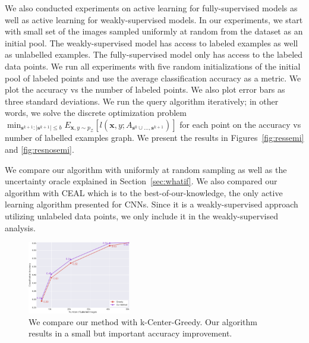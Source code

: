 \documentclass{article} %
\begin{document}
We also conducted experiments on active learning for fully-supervised models as well as active learning for weakly-supervised models. In our experiments, we start with small set of the images sampled uniformly at random from the dataset as an initial pool. The weakly-supervised model has access to labeled examples as well as unlabelled examples. The fully-supervised model only has access to the labeled data points. We run all experiments with five random initializations of the initial pool of labeled points and use the average classification accuracy as a metric. We plot the accuracy vs the number of labeled points. We also plot error bars as three standard deviations. We run the query algorithm iteratively; in other words, we solve the discrete optimization problem $\min_{\mathbf{s}^{k+1} : |\mathbf{s}^{k+1}| \leq b} E_{\mathbf{x},y \sim p_\mathcal{Z}} [l(\mathbf{x},y; A_{\mathbf{s}^{0} \cup \ldots, \mathbf{s}^{k+1}})]$ for each point on the accuracy vs number of labelled examples graph. We present the results in Figures~\ref{fig:ressemi} and \ref{fig:resnosemi}.

We compare our algorithm with uniformly at random sampling as well as the uncertainty oracle explained in Section~\ref{sec:whatif}. We also compared our algorithm with CEAL \citep{wang2016cost} which is to the best-of-our-knowledge, the only active learning algorithm presented for CNNs. Since it is a weakly-supervised approach utilizing unlabeled data points, we only include it in the weakly-supervised analysis.

 \begin{figure}
\includegraphics[width=0.4\textwidth]{mip_100_3.pdf}
\caption{We compare our method with k-Center-Greedy. Our algorithm results in a small but important accuracy improvement. }
\label{fig:twoopt}
\vspace{-5mm}
\end{figure}
\end{document}
